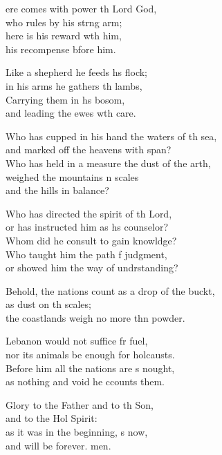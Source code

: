 \settowidth{\versewidth}{Behold, the nations count as a drop of the bucket, +}
\begin{psalmverse}%
  \begin{patverse}
ere comes with power th Lord God,\Med\\
who rules by his strng arm;\\
here is his reward w\pointup{\i}th him,\Med\\
his recompense bfore him.

Like a shepherd he feeds h\pointup{\i}s flock;\Med\\
in his arms he gathers th lambs,\\
Carrying them in h\pointup{\i}s bosom,\Med\\
and leading the ewes w\pointup{\i}th care.

Who has cupped in his hand the waters of th sea,\Med\\
and marked off the heavens with  span?\\
Who has held in a measure the dust of the arth,\Flex\\
weighed the mountains \pointup{\i}n scales\Med\\
and the hills in  balance?

Who has directed the spirit of th Lord,\Med\\
or has instructed him as h\pointup{\i}s counselor?\\
Whom did he consult to gain knowldge?\Flex\\
Who taught him the path f judgment,\Med\\
or showed him the way of undrstanding?

Behold, the nations count as a drop of the buckt,\Flex\\
as dust on th scales;\Med\\
the coastlands weigh no more thn powder.

Lebanon would not suffice fr fuel,\Med\\
nor its animals be enough for holcausts.\\
Before him all the nations are s nought,\Med\\
as nothing and void he ccounts them.

Glory to the Father and to th Son,\Med\\
and to the Hol Spirit:\\
as it was in the beginning, \pointup{\i}s now,\Med\\
and will be forever. men.
  \end{patverse}
\end{psalmverse}
